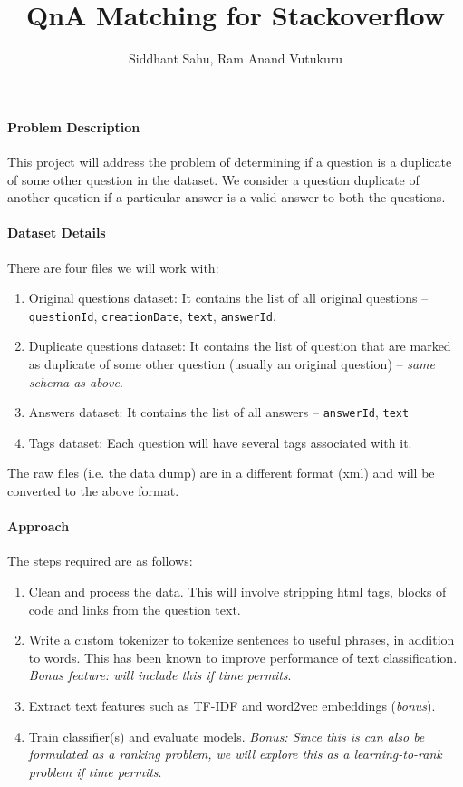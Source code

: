 \documentclass{article}
\title{QnA Matching for Stackoverflow}
\author{Siddhant Sahu, Ram Anand Vutukuru}
\begin{document}
\maketitle

\paragraph{Problem Description} This project will address the problem of determining if a question is a duplicate of some other question in the dataset. We consider a question duplicate of another question if a particular answer is a valid answer to both the questions.

\paragraph{Dataset Details} There are four files we will work with:
\begin{enumerate}
	\item Original questions dataset: It contains the list of all original questions -- \texttt{questionId}, \texttt{creationDate}, \texttt{text}, \texttt{answerId}.
	\item Duplicate questions dataset: It contains the list of question that are marked as duplicate of some other question (usually an original question) -- \textit{same schema as above}.
	\item Answers dataset: It contains the list of all answers -- \texttt{answerId}, \texttt{text}
	\item Tags dataset: Each question will have several tags associated with it.
\end{enumerate}

The raw files (i.e. the data dump) are in a different format (xml) and will be converted to the above format.

\paragraph{Approach}
The steps required are as follows:
\begin{enumerate}
	\item Clean and process the data. This will involve stripping html tags, blocks of code and links from the question text.
	\item Write a custom tokenizer to tokenize sentences to useful phrases, in addition to words. This has been known to improve performance of text classification. \textit{Bonus feature: will include this if time permits}.
	\item Extract text features such as TF-IDF and word2vec embeddings (\textit{bonus}).
	\item Train classifier(s) and evaluate models. \textit{Bonus: Since this is can also be formulated as a ranking problem, we will explore this as a learning-to-rank problem if time permits}.
\end{enumerate}
\end{document}
